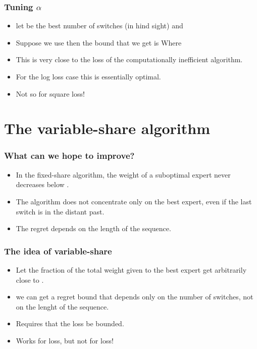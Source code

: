 \documentclass[handout]{beamer}
\begin{document}
\begin{frame}
\frametitle{Tuning $\alpha$}
\begin{itemize}
\item let  be the best number of switches (in hind sight) 
and 
\item Suppose we use \R{$\alpha \approx \alpha^*$} then the bound that we get is
Where
\R{
\[
H(\alpha^*) = -\alpha^* \ln \alpha^* - (1-\alpha^*) \ln (1-\alpha^*)
\]
\[
D_{\text{KL}}(\alpha^* || \alpha) = 
\alpha^* \ln \frac{\alpha^*}{\alpha}  (1-\alpha^*) \ln \frac{1-\alpha^*}{1-\alpha}
\]
}
\item This is very close to the loss of the computationally inefficient algorithm.
\item For the log loss case this is essentially optimal.
\item Not so for square loss!
\end{itemize}
\end{frame}

\section{The variable-share algorithm}

\begin{frame}
\frametitle{What can we hope to improve?}
\begin{itemize}
\item In the fixed-share algorithm, the 
weight of a suboptimal expert never decreases below
.
\item The algorithm does not concentrate only on the best expert, even
if the last switch is in the distant past.
\item The regret depends on the length of the sequence.
\end{itemize}
\end{frame}

\begin{frame}
\frametitle{The idea of variable-share}
\begin{itemize}
\item Let the fraction of the total weight given to the 
best expert get arbitrarily close to .
\item we can get a regret bound that depends only on the number of
switches, not on the lenght of the sequence.
\item Requires that the loss be bounded.
\item Works for  loss, but not for  loss!
\end{itemize}
\end{frame}
\end{document}
